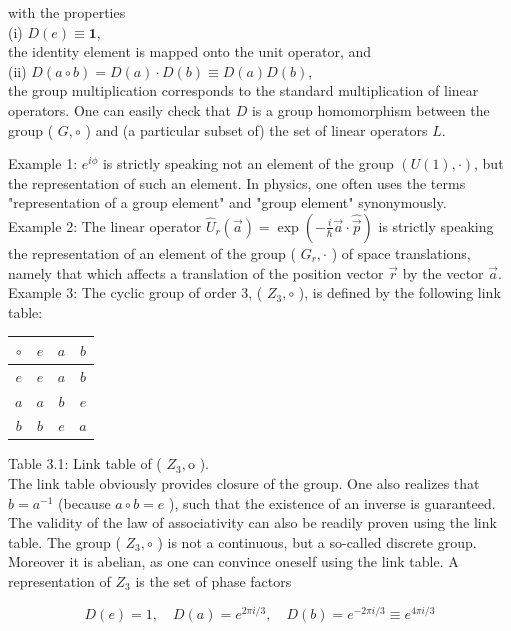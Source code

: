 \documentclass[10pt, letterpaper]{article}
\begin{document}
with the properties\\
(i) $D(e) \equiv \mathbf{1}$,\\
the identity element is mapped onto the unit operator, and\\
(ii) $D(a \circ b)=D(a) \cdot D(b) \equiv D(a) D(b)$,\\
the group multiplication corresponds to the standard multiplication of linear operators. One can easily check that $D$ is a group homomorphism between the group ( $G, \circ$ ) and (a particular subset of) the set of linear operators $L$.

Example 1: $e^{i \phi}$ is strictly speaking not an element of the group $(U(1), \cdot)$, but the representation of such an element. In physics, one often uses the terms "representation of a group element" and "group element" synonymously.\\
Example 2: The linear operator $\hat{U}_{r}(\vec{a})=\exp \left(-\frac{i}{\hbar} \vec{a} \cdot \hat{\vec{p}}\right)$ is strictly speaking the representation of an element of the group ( $G_{r}, \cdot$ ) of space translations, namely that which affects a translation of the position vector $\vec{r}$ by the vector $\vec{a}$.\\
Example 3: The cyclic group of order 3, ( $Z_{3}, \circ$ ), is defined by the following link table:

\begin{center}
\begin{tabular}{c||c|c|c|}
$\circ$ & $e$ & $a$ & $b$ \\
\hline\hline
$e$ & $e$ & $a$ & $b$ \\
\hline
$a$ & $a$ & $b$ & $e$ \\
\hline
$b$ & $b$ & $e$ & $a$ \\
\hline
\end{tabular}
\end{center}

Table 3.1: Link table of ( $Z_{3}, \mathrm{o}$ ).\\
The link table obviously provides closure of the group. One also realizes that $b=a^{-1}$ (because $a \circ b=e$ ), such that the existence of an inverse is guaranteed. The validity of the law of associativity can also be readily proven using the link table. The group ( $Z_{3}, \circ$ ) is not a continuous, but a so-called discrete group. Moreover it is abelian, as one can convince oneself using the link table. A representation of $Z_{3}$ is the set of phase factors

$$
D(e)=1, \quad D(a)=e^{2 \pi i / 3}, \quad D(b)=e^{-2 \pi i / 3} \equiv e^{4 \pi i / 3}
$$
\end{document}
